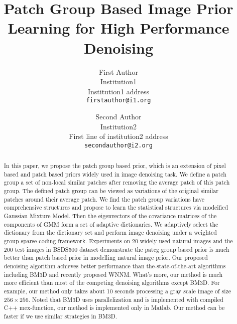 \documentclass[10pt,twocolumn,letterpaper]{article}
\begin{document}
\title{Patch Group Based Image Prior Learning for High Performance Denoising}

\author{First Author\\
Institution1\\
Institution1 address\\
{\tt\footnotesize firstauthor@i1.org}
\and
Second Author\\
Institution2\\
First line of institution2 address\\
{\tt\footnotesize secondauthor@i2.org}
}
\maketitle
\begin{abstract}
In this paper, we propose the patch group based prior, which is an extension of pixel based and patch based priors widely used in image denoising task. We define a patch group a set of non-local similar patches after removing the average patch of this patch group. The defined patch group can be viewed as variations of the original similar patches around their average patch. We find the patch group variations have comprehensive structures and propose to learn the statistical structures via modeified Gaussian Mixture Model. Then the eigenvectors of the covariance matrices of the components of GMM form a set of adaptive dictionaries. We adaptively select the dictionary from the dictionary set and perform image denoising under a weighted group sparse coding framework. Experiments on 20 widely used natural images and the 200 test images in BSDS500 dataset demonstrate the patcg group based prior is much better than patch based prior in modelling natural image prior. Our proposed denoising algorithm achieves better performance than the-state-of-the-art algorithms including BM3D and recently proposed WNNM. What's more, our method is much more efficient than most of the competing denoising algorithms except BM3D. For example, our method only takes about 10 seconds processing a gray scale image of size $256\times256$. Noted that BM3D uses parallelization and is implemented with compiled C++ mex-function, our method is implemented only in Matlab. Our method can be faster if we use similar strategies in BM3D.
\end{abstract}
\end{document}
